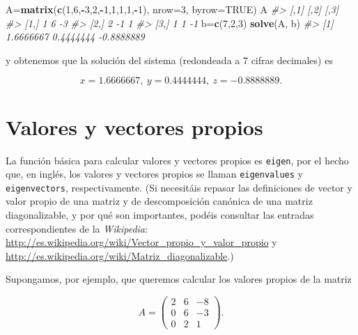 \documentclass[
]{book}
\newenvironment{Shaded}{\begin{snugshade}}{\end{snugshade}}
\newcommand{\CommentTok}[1]{\textcolor[rgb]{0.56,0.35,0.01}{\textit{#1}}}
\newcommand{\DataTypeTok}[1]{\textcolor[rgb]{0.13,0.29,0.53}{#1}}
\newcommand{\DecValTok}[1]{\textcolor[rgb]{0.00,0.00,0.81}{#1}}
\newcommand{\KeywordTok}[1]{\textcolor[rgb]{0.13,0.29,0.53}{\textbf{#1}}}
\newcommand{\NormalTok}[1]{#1}
\newcommand{\OperatorTok}[1]{\textcolor[rgb]{0.81,0.36,0.00}{\textbf{#1}}}
\newcommand{\OtherTok}[1]{\textcolor[rgb]{0.56,0.35,0.01}{#1}}
\theoremstyle{definition}
\theoremstyle{definition}
\theoremstyle{definition}
\theoremstyle{remark}
\begin{document}
\begin{Shaded}
\begin{Highlighting}[]
\NormalTok{A=}\KeywordTok{matrix}\NormalTok{(}\KeywordTok{c}\NormalTok{(}\DecValTok{1}\NormalTok{,}\DecValTok{6}\NormalTok{,}\OperatorTok{{-}}\DecValTok{3}\NormalTok{,}\DecValTok{2}\NormalTok{,}\OperatorTok{{-}}\DecValTok{1}\NormalTok{,}\DecValTok{1}\NormalTok{,}\DecValTok{1}\NormalTok{,}\DecValTok{1}\NormalTok{,}\OperatorTok{{-}}\DecValTok{1}\NormalTok{), }\DataTypeTok{nrow=}\DecValTok{3}\NormalTok{, }\DataTypeTok{byrow=}\OtherTok{TRUE}\NormalTok{)}
\NormalTok{A}
\CommentTok{\#\textgreater{}      [,1] [,2] [,3]}
\CommentTok{\#\textgreater{} [1,]    1    6   {-}3}
\CommentTok{\#\textgreater{} [2,]    2   {-}1    1}
\CommentTok{\#\textgreater{} [3,]    1    1   {-}1}
\NormalTok{b=}\KeywordTok{c}\NormalTok{(}\DecValTok{7}\NormalTok{,}\DecValTok{2}\NormalTok{,}\DecValTok{3}\NormalTok{)}
\KeywordTok{solve}\NormalTok{(A, b)}
\CommentTok{\#\textgreater{} [1]  1.6666667  0.4444444 {-}0.8888889}
\end{Highlighting}
\end{Shaded}

y obtenemos que la solución del sistema (redondeada a 7 cifras decimales) es

\[
x=1.6666667, \ y=0.4444444, \ z=-0.8888889.
\]

\hypertarget{valores-y-vectores-propios}{%
\section{Valores y vectores propios}\label{valores-y-vectores-propios}}

La función básica para calcular valores y vectores propios es \texttt{eigen}, por el hecho que, en inglés, los valores y vectores propios se llaman \texttt{eigenvalues} y \texttt{eigenvectors}, respectivamente. (Si necesitáis repasar las definiciones de vector y valor propio de una matriz y de descomposición canónica de una matriz diagonalizable, y por qué son importantes, podéis consultar las entradas correspondientes de la \emph{Wikipedia}:
\url{http://es.wikipedia.org/wiki/Vector_propio_y_valor_propio}
y \url{http://es.wikipedia.org/wiki/Matriz_diagonalizable}.)

Supongamos, por ejemplo, que queremos calcular los valores propios de la matriz

\[
A=\left(\begin{array}{ccc}2 & 6 & -8 \\ 0 & 6 & -3 \\ 0 & 2 & 1\end{array}
\right).
\]
\end{document}
